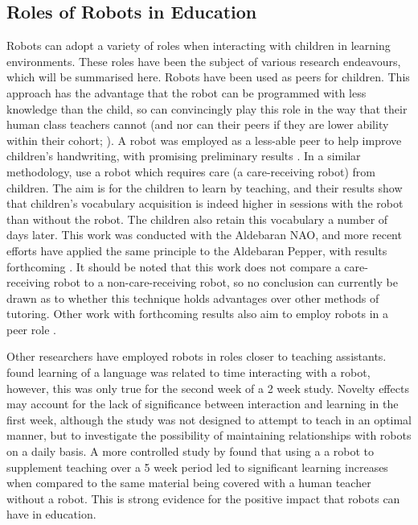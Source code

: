 \subsection{Roles of Robots in Education}
Robots can adopt a variety of roles when interacting with children in learning environments. These roles have been the subject of various research endeavours, which will be summarised here. Robots have been used as peers for children. This approach has the advantage that the robot can be programmed with less knowledge than the child, so can convincingly play this role in the way that their human class teachers cannot (and nor can their peers if they are lower ability within their cohort; \citealp{kennedy2016heart}). A robot was employed as a less-able peer to help improve children's handwriting, with promising preliminary results \citep{hood2015children}. In a similar methodology, \cite{tanaka2012children} use a robot which requires care (a care-receiving robot) from children. The aim is for the children to learn by teaching, and their results show that children's vocabulary acquisition is indeed higher in sessions with the robot than without the robot. The children also retain this vocabulary a number of days later. This work was conducted with the Aldebaran NAO, and more recent efforts have applied the same principle to the Aldebaran Pepper, with results forthcoming \citep{tanaka2015pepper}. It should be noted that this work does not compare a care-receiving robot to a non-care-receiving robot, so no conclusion can currently be drawn as to whether this technique holds advantages over other methods of tutoring. Other work with forthcoming results also aim to employ robots in a peer role \cite{kory2014storytelling}.

Other researchers have employed robots in roles closer to teaching assistants. \cite{kanda2004interactive} found learning of a language was related to time interacting with a robot, however, this was only true for the second week of a 2 week study. Novelty effects may account for the lack of significance between interaction and learning in the first week, although the study was not designed to attempt to teach in an optimal manner, but to investigate the possibility of maintaining relationships with robots on a daily basis. A more controlled study by \cite{alemi2014employing} found that using a a robot to supplement teaching over a 5 week period led to significant learning increases when compared to the same material being covered with a human teacher without a robot. This is strong evidence for the positive impact that robots can have in education.

